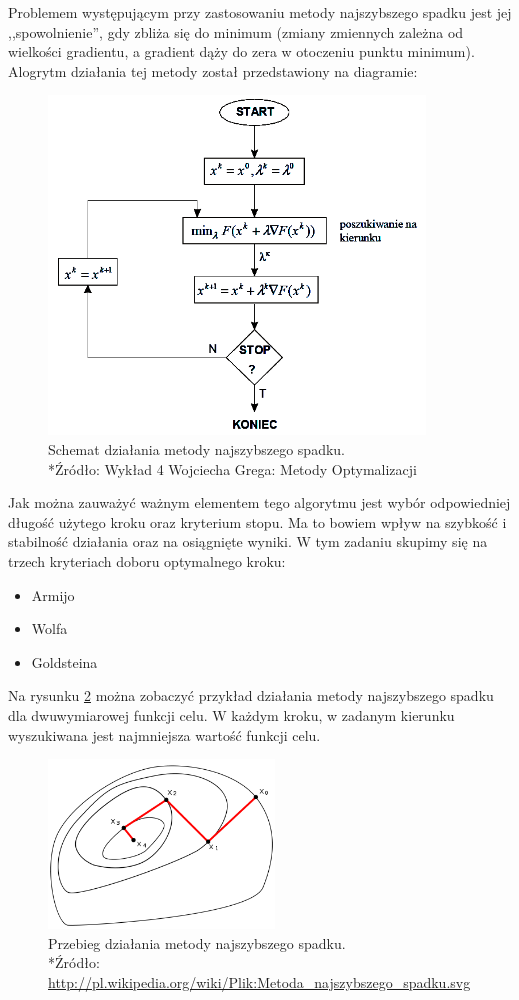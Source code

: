 \documentclass{classrep}
\begin{document}
Problemem występującym przy zastosowaniu metody najszybszego spadku jest jej ,,spowolnienie'', gdy zbliża się do minimum (zmiany zmiennych zależna od wielkości gradientu, a gradient dąży do zera w otoczeniu punktu minimum). Alogrytm działania tej metody został przedstawiony na diagramie:
\begin{figure}[h!]
\centering
\includegraphics[width=10cm]{obrazy/metodaNS_algo} 
\caption{Schemat działania metody najszybszego spadku.\\*{\footnotesize Źródło: Wykład 4 Wojciecha Grega: Metody Optymalizacji}}
\label{fig:metodaNS_algo}
\end{figure}

Jak można zauważyć ważnym elementem tego algorytmu jest wybór odpowiedniej długość użytego kroku oraz kryterium stopu. Ma to bowiem wpływ na szybkość i stabilność działania oraz na osiągnięte wyniki. W tym zadaniu skupimy się na trzech kryteriach doboru optymalnego kroku:
\begin{itemize}
\item Armijo
\item Wolfa
\item Goldsteina
\end{itemize}

Na rysunku \ref{fig:metodaNS_przebieg} można zobaczyć przykład działania metody najszybszego spadku dla dwuwymiarowej funkcji celu. W każdym kroku, w zadanym kierunku wyszukiwana jest najmniejsza wartość funkcji celu.
\begin{figure}[h!]
\centering
\includegraphics[width=6cm]{obrazy/metodaNS_przebieg} 
\caption{Przebieg działania metody najszybszego spadku. \\*{\footnotesize Źródło: \url{http://pl.wikipedia.org/wiki/Plik:Metoda_najszybszego_spadku.svg}}}
\label{fig:metodaNS_przebieg}
\end{figure}
\end{document}
